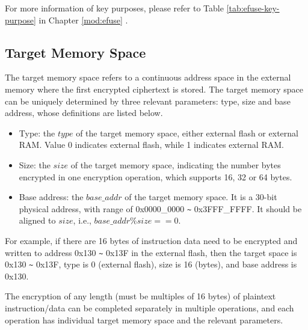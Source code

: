 \documentclass[main\_\_EN.tex]{subfiles}
\begin{document}
\clearpage


For more information of key purposes, please refer to Table \ref{tab:efuse-key-purpose} \textit{} in Chapter \ref{mod:efuse} \textit{}.

\subsection{Target Memory Space}
\label{sec:extmemencr-target-space}

The target memory space refers to a continuous address space in the external memory where the first encrypted ciphertext is stored. The target memory space can be uniquely determined by three relevant parameters: type, size and base address, whose definitions are listed below.

\begin{itemize}
    \item Type: the \begin{math} type \end{math} of the target memory space, either external flash or external RAM. Value 0 indicates external flash, while 1 indicates external RAM.
    \item Size: the \begin{math} size \end{math} of the target memory space, indicating the number bytes encrypted in one encryption operation, which supports 16, 32 or 64 bytes.
    \item Base address: the \begin{math} base\_addr\end{math} of the target memory space. It is a 30-bit physical address, with range of 0x{}0000\_0000 \verb+~+ 0x{}3FFF\_FFFF. It should be aligned to \begin{math} size \end{math}, i.e., \begin{math} base\_addr \% size == 0 \end{math}.
\end{itemize}

For example, if there are 16 bytes of instruction data need to be encrypted and written to address 0x{}130 \verb+~+ 0x{}13F in the external flash, then the target space is 0x{}130 \verb+~+ 0x{}13F, type is 0 (external flash), size is 16 (bytes), and base address is 0x{}130.

The encryption of any length (must be multiples of 16 bytes) of plaintext instruction/data can be completed separately in multiple operations, and each operation has individual target memory space and the relevant parameters.
\end{document}
